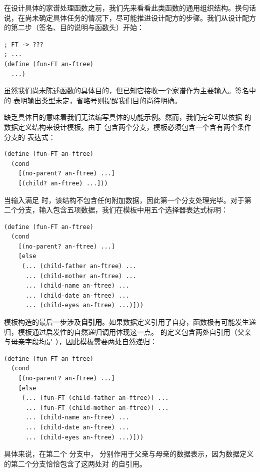 在设计具体的家谱处理函数之前，我们先来看看此类函数的通用组织结构。换句话说，在尚未确定具体任务的情况下，尽可能推进设计配方的步骤。我们从设计配方的第二步（签名、目的说明与函数头）开始：

\begin{lstlisting}[language=BSL]
; FT -> ???
; ...
(define (fun-FT an-ftree)
  ...)
\end{lstlisting}

虽然我们尚未陈述函数的具体目的，但已知它接收一个家谱作为主要输入。签名中的  表明输出类型未定，省略号则提醒我们目的尚待明确。

缺乏具体目的意味着我们无法编写具体的功能示例。然而，我们完全可以依据  的数据定义结构来设计模板。由于  包含两个分支，模板必须包含一个含有两个条件分支的  表达式：

\begin{lstlisting}[language=BSL]
(define (fun-FT an-ftree)
  (cond
    [(no-parent? an-ftree) ...]
    [(child? an-ftree) ...]))
\end{lstlisting}

当输入满足  时，该结构不包含任何附加数据，因此第一个分支处理完毕。对于第二个分支，输入包含五项数据，我们在模板中用五个选择器表达式标明：

\begin{lstlisting}[language=BSL]
(define (fun-FT an-ftree)
  (cond
    [(no-parent? an-ftree) ...]
    [else
     (... (child-father an-ftree) ...
      ... (child-mother an-ftree) ...
      ... (child-name an-ftree) ...
      ... (child-date an-ftree) ...
      ... (child-eyes an-ftree) ...)]))
\end{lstlisting}

模板构造的最后一步涉及\textbf{自引用}。如果数据定义引用了自身，函数极有可能发生递归，模板通过启发性的自然递归调用体现这一点。 的定义包含两处自引用（父亲与母亲字段均是 ），因此模板需要两处自然递归：

\begin{lstlisting}[language=BSL]
(define (fun-FT an-ftree)
  (cond
    [(no-parent? an-ftree) ...]
    [else
     (... (fun-FT (child-father an-ftree)) ...
      ... (fun-FT (child-mother an-ftree)) ...
      ... (child-name an-ftree) ...
      ... (child-date an-ftree) ...
      ... (child-eyes an-ftree) ...)]))
\end{lstlisting}

具体来说，在第二个  分支中， 分别作用于父亲与母亲的数据表示，因为数据定义的第二个分支恰恰包含了这两处对  的自引用。

